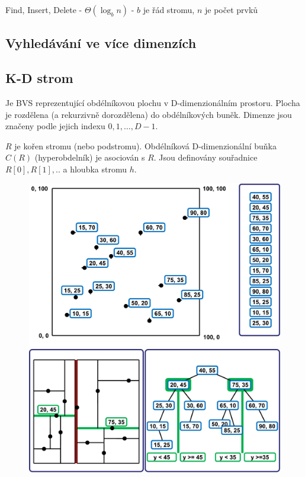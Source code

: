 Find, Insert, Delete - $\Theta(\log_b n)$ - $b$ je řád stromu, $n$ je počet prvků


\subsection{Vyhledávání ve více dimenzích}

\subsection{K-D strom}
Je BVS reprezentující obdélníkovou plochu v D-dimenzionálním prostoru. Plocha je rozdělena (a rekurzivně dorozdělena) do obdélníkových buněk. Dimenze jsou značeny podle jejich indexu $0,1,\hdots,D-1$.

$R$ je kořen stromu (nebo podstromu). Obdélníková D-dimenzionální buňka $C(R)$ (hyperobdelník) je asociován s $R$. Jsou definovány souřadnice $R[0],R[1], ..$ a hloubka stromu $h$.

\begin{figure}[h]
    \begin{center}
        \includegraphics[width=130mm]{03/images/kdtree01}
        \includegraphics[width=130mm]{03/images/kdtree02}
    \end{center}
\end{figure}

